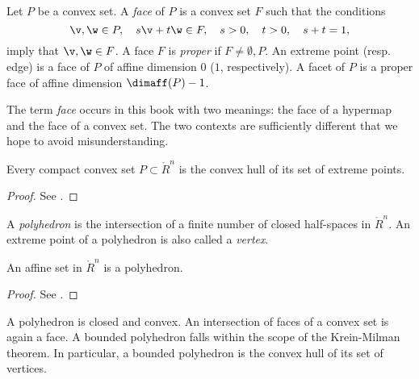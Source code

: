 \begin{definition}
Let $P$ be a convex set.  A {\it face} of $P$ is a convex set $F$ such that the conditions
$$
\v,\w\in P,\quad s \v + t \w \in F,\quad s>0,\quad t>0,\quad s+t = 1,
$$ 
imply that $\v,\w\in F$.  A face $F$ is {\it proper} if $F\ne \emptyset,P$.    An extreme point (resp. edge) is a face of $P$ of affine dimension $0$ ($1$, respectively).   A facet of $P$ is a proper face of affine dimension $\dimaff(P)-1$.
%
%
%
%
%
\end{definition}

\begin{remark} The term {\it face} occurs in this book with two meanings: the face of a hypermap and the face of a convex set.  The two contexts are sufficiently different that we hope to avoid misunderstanding.
\end{remark}

\begin{lemma} Every compact convex set $P\subset\ring{R}^n$ is the convex hull of its set of extreme points.
\end{lemma}

\begin{proof}  See \cite[Theorem~2.6.16]{webster:1994}.
\end{proof}


\begin{definition}  A {\it polyhedron} is the intersection of
a finite number of closed half-spaces in $\ring{R}^n$.  An extreme point of a polyhedron is also called a {\it vertex}.
\end{definition}
%

\begin{lemma}\label{lemma:aff-poly}
An affine set in $\ring{R}^n$ is a polyhedron.
\end{lemma}

\begin{proof} See \cite[Cor~1.4.2]{webster:1994}.
\end{proof}

A polyhedron is closed and convex.  An intersection of faces of a convex set is again a face.  A bounded polyhedron falls within the scope of the Krein-Milman theorem.  In particular, a bounded polyhedron is the convex hull of its set of vertices.
%

